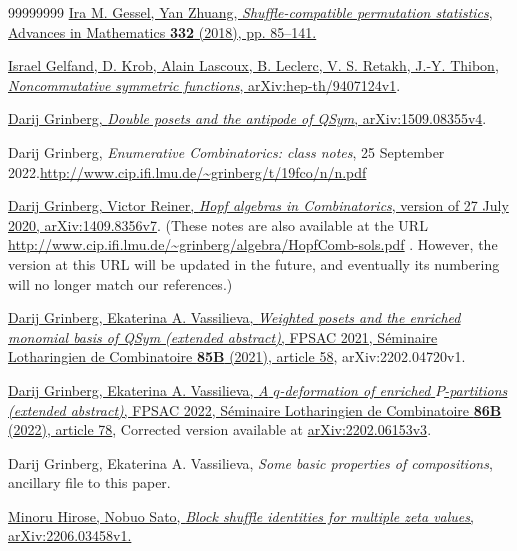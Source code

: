\documentclass[numbers=enddot,12pt,final,onecolumn,notitlepage]{scrartcl}%
\theoremstyle{definition}
\begin{document}
\begin{thebibliography}{99999999}
%
\href{https://doi.org/10.1016/j.aim.2018.05.003}{Ira M. Gessel, Yan Zhuang,
\textit{Shuffle-compatible permutation statistics}, Advances in Mathematics
\textbf{332} (2018), pp. 85--141.}

%
\href{https://arxiv.org/abs/hep-th/9407124v1}{Israel Gelfand, D. Krob, Alain
Lascoux, B. Leclerc, V. S. Retakh, J.-Y. Thibon, \textit{Noncommutative
symmetric functions}, arXiv:hep-th/9407124v1}.

\href{https://arxiv.org/abs/1509.08355v4}{Darij
Grinberg, \textit{Double posets and the antipode of QSym}, arXiv:1509.08355v4}.

Darij Grinberg, \textit{Enumerative Combinatorics:
class notes}, 25 September 2022.\newline\url{http://www.cip.ifi.lmu.de/~grinberg/t/19fco/n/n.pdf}

\href{https://arxiv.org/abs/1409.8356v7}{Darij
Grinberg, Victor Reiner, \textit{Hopf algebras in Combinatorics}, version of
27 July 2020, arXiv:1409.8356v7}. \newline(These notes are also available at
the URL \url{http://www.cip.ifi.lmu.de/~grinberg/algebra/HopfComb-sols.pdf} .
However, the version at this URL will be updated in the future, and eventually
its numbering will no longer match our references.)

%
\href{https://www.mat.univie.ac.at/~slc/wpapers/FPSAC2021/58.html}{Darij
Grinberg, Ekaterina A. Vassilieva, \textit{Weighted posets and the enriched
monomial basis of QSym (extended abstract)}, FPSAC 2021, S\'{e}minaire
Lotharingien de Combinatoire \textbf{85B} (2021), article 58}, arXiv:2202.04720v1.

\href{https://arxiv.org/abs/2202.06153v3}{Darij
Grinberg, Ekaterina A. Vassilieva, \textit{A }$\mathit{q}$\textit{-deformation
of enriched }$\mathit{P}$\textit{-partitions (extended abstract)}, FPSAC 2022,
S\'{e}minaire Lotharingien de Combinatoire \textbf{86B} (2022), article 78},
Corrected version available at
\href{https://arxiv.org/abs/2202.06153v3}{arXiv:2202.06153v3}.

Darij Grinberg, Ekaterina A. Vassilieva, \textit{Some
basic properties of compositions}, ancillary file to this paper.

\href{https://arxiv.org/abs/2206.03458v1}{Minoru
Hirose, Nobuo Sato, \textit{Block shuffle identities for multiple zeta
values}, arXiv:2206.03458v1.}


\end{thebibliography}
\end{document}
